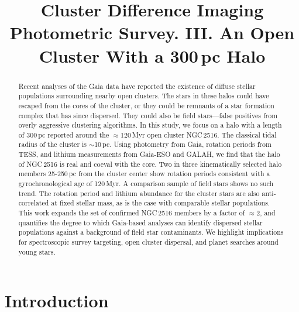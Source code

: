 \documentclass[12pt,twocolumn,tighten]{aastex63}
\begin{document}

\title{
  Cluster Difference Imaging Photometric Survey. III.
  An Open Cluster With a 300\,pc Halo
}



\begin{abstract}
  Recent analyses of the Gaia data have reported the existence of
  diffuse stellar populations surrounding nearby open clusters.  The
  stars in these halos could have escaped from the cores of the
  cluster, or they could be remnants of a star formation complex that
  has since dispersed.  They could also be field stars---false
  positives from overly aggressive clustering algorithms.  In this
  study, we focus on a halo with a length of 300\,pc reported around
  the $\approx$120\,Myr open cluster NGC\,2516.  The classical tidal
  radius of the cluster is $\sim$10\,pc.  Using photometry from Gaia,
  rotation periods from TESS, and lithium measurements from Gaia-ESO
  and GALAH, we find that the halo of NGC\,2516 is real and coeval
  with the core.  Two in three kinematically selected halo members
  25-250\,pc from the cluster center show rotation periods consistent
  with a gyrochronological age of 120\,Myr.  A comparison sample of
  field stars shows no such trend.  The rotation period and lithium
  abundance for the cluster stars are also anti-correlated at fixed
  stellar mass, as is the case with comparable stellar populations.
  This work expands the set of confirmed NGC\,2516 members by a factor
  of $\approx$2, and quantifies the degree to which Gaia-based
  analyses can identify dispersed stellar populations against a
  background of field star contaminants.  We highlight implications
  for spectroscopic survey targeting, open cluster dispersal, and
  planet searches around young stars.
\end{abstract}





\section{Introduction}
\end{document}
